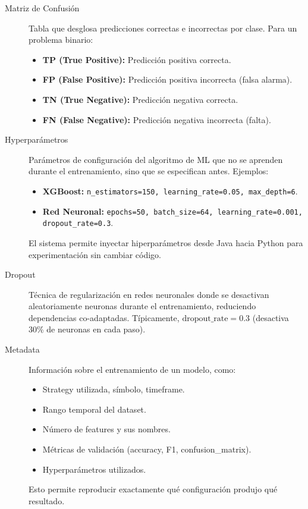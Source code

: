 \begin{description}
    \item[Matriz de Confusión] Tabla que desglosa predicciones correctas e incorrectas por clase. Para un problema binario:
    \begin{itemize}
        \item \textbf{TP (True Positive):} Predicción positiva correcta.
        \item \textbf{FP (False Positive):} Predicción positiva incorrecta (falsa alarma).
        \item \textbf{TN (True Negative):} Predicción negativa correcta.
        \item \textbf{FN (False Negative):} Predicción negativa incorrecta (falta).
    \end{itemize}

    \item[Hyperparámetros] Parámetros de configuración del algoritmo de ML que no se aprenden durante el entrenamiento, sino que se especifican antes. Ejemplos:
    \begin{itemize}
        \item \textbf{XGBoost:} \texttt{n\_estimators=150, learning\_rate=0.05, max\_depth=6}.
        \item \textbf{Red Neuronal:} \texttt{epochs=50, batch\_size=64, learning\_rate=0.001, dropout\_rate=0.3}.
    \end{itemize}
    El sistema permite inyectar hiperparámetros desde Java hacia Python para experimentación sin cambiar código.

    \item[Dropout] Técnica de regularización en redes neuronales donde se desactivan aleatoriamente neuronas durante el entrenamiento, reduciendo dependencias co-adaptadas. Típicamente, \(\text{dropout\_rate} = 0.3\) (desactiva 30\% de neuronas en cada paso).

    \item[Metadata] Información sobre el entrenamiento de un modelo, como:
    \begin{itemize}
        \item Strategy utilizada, símbolo, timeframe.
        \item Rango temporal del dataset.
        \item Número de features y sus nombres.
        \item Métricas de validación (accuracy, F1, confusion\_matrix).
        \item Hyperparámetros utilizados.
    \end{itemize}
    Esto permite reproducir exactamente qué configuración produjo qué resultado.

\end{description}


